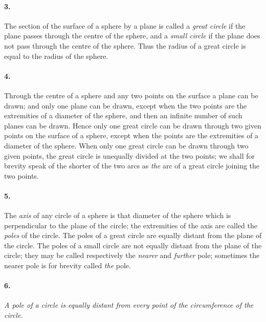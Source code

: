 \documentclass{book}[2004/02/16]
\begin{document}
\begin{mainmatter}
\begin{spacing}{1.3}
\paragraph{3.} The section of the surface of a sphere by a plane is called
a \textit{great circle} if the plane passes through the centre of the sphere,
and a \textit{small circle} if the plane does not pass through the centre of
the sphere. Thus the radius of a great circle is equal to the
radius of the sphere.

\paragraph{4.} Through the centre of a sphere and any two points on the
surface a plane can be drawn; and only one plane can be drawn,
except when the two points are the extremities of a diameter of
the sphere, and then an infinite number of such planes can be
drawn. Hence only one great circle can be drawn through two
given points on the surface of a sphere, except when the points are
the extremities of a diameter of the sphere. When only one great
circle can be drawn through two given points, the great circle is
unequally divided at the two points; we shall for brevity speak of
the shorter of the two arcs as \textit{the} arc of a great circle joining the
two points.

\paragraph{5.} The \textit{axis} of any circle of a sphere is that diameter of the
sphere which is perpendicular to the plane of the circle; the extremities
of the axis are called the \textit{poles} of the circle. The poles
of a great circle are equally distant from the plane of the circle.
The poles of a small circle are not equally distant from the plane
of the circle; they may be called respectively the \textit{nearer} and \textit{further}
pole; sometimes the nearer pole is for brevity called \textit{the} pole.

\paragraph{6.} \textit{A pole of a circle is equally distant from every point of the
circumference of the circle.}


\end{spacing}
\end{mainmatter}
\end{document}
